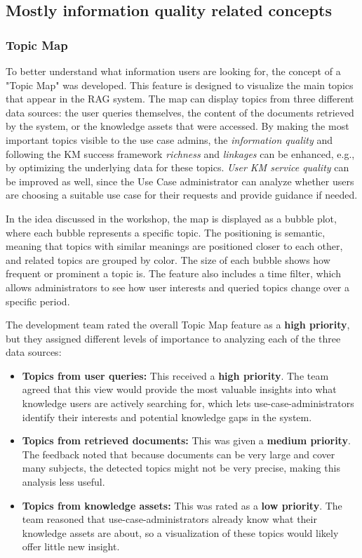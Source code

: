 \documentclass[
	english,
	ruledheaders=section,%
	class=report,%
	thesis={type=bachelor},%
	accentcolor=1b,%
	custommargins=true,%
	marginpar=false,%
	parskip=half-,%
	fontsize=11pt,%
	DIV=14,
]{tudapub}
\begin{document}
\subsection{Mostly information quality related concepts}
\subsubsection{Topic Map}
To better understand what information users are looking for, the concept of a "Topic Map" was developed. This feature is designed to visualize the main topics that appear in the RAG system. The map can display topics from three different data sources: the user queries themselves, the content of the documents retrieved by the system, or the knowledge assets that were accessed. By making the most important topics visible to the use case admins, the \textit{information quality} and following the KM success framework \textit{richness} and \textit{linkages} can be enhanced, e.g., by optimizing the underlying data for these topics. \textit{User KM service quality} can be improved as well, since the Use Case administrator can analyze whether users are choosing a suitable use case for their requests and provide guidance if needed.

In the idea discussed in the workshop, the map is displayed as a bubble plot, where each bubble represents a specific topic. The positioning is semantic, meaning that topics with similar meanings are positioned closer to each other, and related topics are grouped by color. The size of each bubble shows how frequent or prominent a topic is. The feature also includes a time filter, which allows administrators to see how user interests and queried topics change over a specific period.

The development team rated the overall Topic Map feature as a \textbf{high priority}, but they assigned different levels of importance to analyzing each of the three data sources:

\begin{itemize}
    \item \textbf{Topics from user queries:} This received a \textbf{high priority}. The team agreed that this view would provide the most valuable insights into what knowledge users are actively searching for, which lets use-case-administrators identify their interests and potential knowledge gaps in the system.
    
    \item \textbf{Topics from retrieved documents:} This was given a \textbf{medium priority}. The feedback noted that because documents can be very large and cover many subjects, the detected topics might not be very precise, making this analysis less useful.
    
    \item \textbf{Topics from knowledge assets:} This was rated as a \textbf{low priority}. The team reasoned that use-case-administrators already know what their knowledge assets are about, so a visualization of these topics would likely offer little new insight.
\end{itemize}
\end{document}
